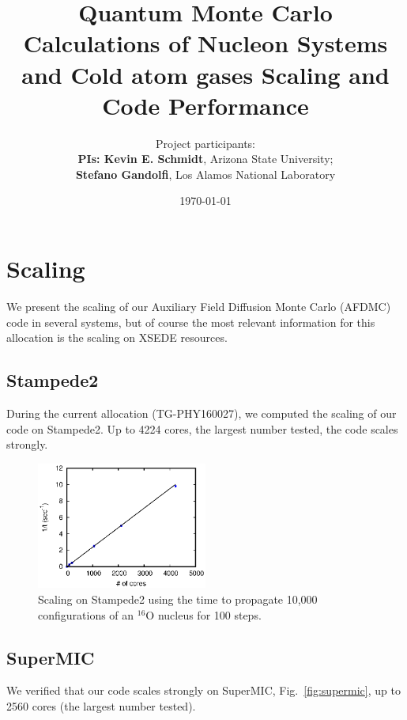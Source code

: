 \documentclass[12pt,letterpaper]{article}
\newcommand{\project}{\large Quantum Monte Carlo Calculations of Nucleon 
Systems and Cold atom gases \vskip 0.5cm}
\begin{document}
\onehalfspacing
\title{\project {\Large \textbf{Scaling and Code Performance}} \vspace{0cm}}
\author{
Project participants:\\
{\bf PIs: Kevin E. Schmidt}, Arizona State University; \\
{\bf Stefano Gandolfi}, Los Alamos National Laboratory\\
}
\date{\today}
\maketitle
\section{Scaling}
We present the scaling of our Auxiliary Field Diffusion Monte Carlo (AFDMC) 
code in several systems, but of course the 
most relevant information for this allocation is the scaling on XSEDE 
resources.

\subsection{Stampede2}

During the current allocation (TG-PHY160027), we computed
the scaling of our code
on Stampede2. Up to 4224
cores, the 
largest number tested, the code scales strongly.

\begin{figure}[h]
   \centering
   \includegraphics[width=0.5\textwidth]{stampede.eps}
   \caption{Scaling on Stampede2 using the time to propagate 10,000 
   configurations of an $^{16}$O nucleus for 100 steps.}
   \label{fig:scaling}
\end{figure}

\subsection{SuperMIC}
We verified that our code scales 
strongly on SuperMIC, Fig.~\ref{fig:supermic}, up to 2560 cores (the largest 
number tested).
\end{document}
